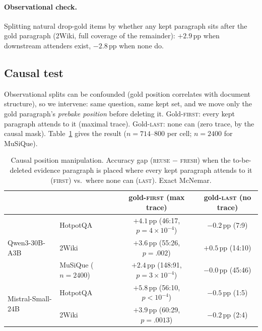 \documentclass{article} %
\newcommand{\pp}{\,\mathrm{pp}}
\newcommand{\fresh}{\textsc{fresh}}
\newcommand{\reuse}{\textsc{reuse}}
\begin{document}
\paragraph{Observational check.}
Splitting natural drop-gold items by whether any kept paragraph sits after the gold paragraph (2Wiki, full coverage of the remainder): $+2.9\pp$ when downstream attenders exist, $-2.8\pp$ when none do.

\subsection{Causal test}
\label{sec:causal}

Observational splits can be confounded (gold position correlates with document structure), so we intervene: same question, same kept set, and we move only the gold paragraph's \emph{prebake position} before deleting it. Gold-\textsc{first}: every kept paragraph attends to it (maximal trace). Gold-\textsc{last}: none can (zero trace, by the causal mask). Table~\ref{tab:causal} gives the result ($n=714$--$800$ per cell; $n=2400$ for MuSiQue).

\begin{table}[t]
\centering
\caption{Causal position manipulation. Accuracy gap (\reuse{} $-$ \fresh{}) when the to-be-deleted evidence paragraph is placed where every kept paragraph attends to it (\textsc{first}) vs.\ where none can (\textsc{last}). Exact McNemar.}
\label{tab:causal}
\begin{tabular}{llcc}
\toprule
& & gold-\textsc{first} (max trace) & gold-\textsc{last} (no trace) \\
\midrule
\multirow{3}{*}{Qwen3-30B-A3B}
& HotpotQA & $\mathbf{+4.1}\pp$ {\scriptsize(46:17, $p{=}4{\times}10^{-4}$)} & $-0.2\pp$ {\scriptsize(7:9)} \\
& 2Wiki & $\mathbf{+3.6}\pp$ {\scriptsize(55:26, $p{=}.002$)} & $+0.5\pp$ {\scriptsize(14:10)} \\
& MuSiQue {\scriptsize($n{=}2400$)} & $\mathbf{+2.4}\pp$ {\scriptsize(148:91, $p{=}3{\times}10^{-4}$)} & $-0.0\pp$ {\scriptsize(45:46)} \\
\midrule
\multirow{2}{*}{Mistral-Small-24B}
& HotpotQA & $\mathbf{+5.8}\pp$ {\scriptsize(56:10, $p{<}10^{-4}$)} & $-0.5\pp$ {\scriptsize(1:5)} \\
& 2Wiki & $\mathbf{+3.9}\pp$ {\scriptsize(60:29, $p{=}.0013$)} & $-0.2\pp$ {\scriptsize(2:4)} \\
\bottomrule
\end{tabular}
\end{table}
\end{document}

